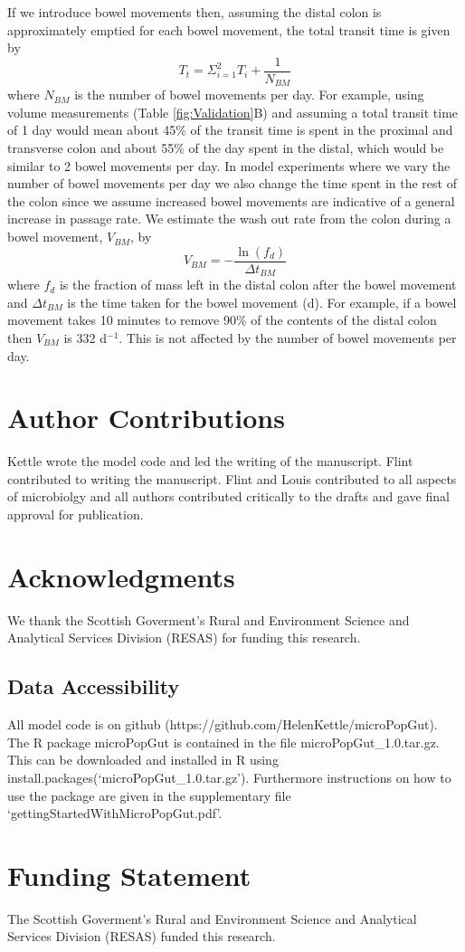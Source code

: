 \documentclass[a4paper]{article}
\begin{document}
If we introduce bowel movements then, assuming the distal colon is approximately emptied for each bowel movement, the total transit time is given by 
\begin{equation}
    T_t=\Sigma_{i=1}^2T_i + \frac{1}{N_{BM}}
\end{equation}
where $N_{BM}$ is the number of bowel movements per day.
For example, using volume measurements (Table \ref{fig:Validation}B) and assuming a total transit time of 1 day would mean about 45\% of the transit time is spent in the proximal and transverse colon and about 55\% of the day spent in the distal, which would be similar to 2 bowel movements per day. 
In model experiments where we vary the number of bowel movements per day we also change the time spent in the rest of the colon since we assume increased bowel movements are indicative of a general increase in passage rate.
We estimate the wash out rate from the colon during a bowel movement, $V_{BM}$, by
\begin{equation}
    V_{BM}=-\frac{\ln(f_d)}{\Delta t_{BM}}
\end{equation}
where $f_d$ is the fraction of mass left in the distal colon after the bowel movement and $\Delta t_{BM}$ is the time taken for the bowel movement (d). For example, if a bowel movement takes 10 minutes to remove 90\% of the contents of the distal colon then $V_{BM}$ is 332  d$^{-1}$. This is not affected by the number of bowel movements per day.

\section*{Author Contributions}
Kettle wrote the model code and led the writing of the manuscript. Flint contributed to writing the manuscript. Flint and Louis contributed to all aspects of microbiolgy and all authors contributed critically to the drafts and gave final approval for publication.

\section*{Acknowledgments}
We thank the Scottish Goverment's Rural and Environment Science and Analytical Services Division (RESAS) for funding this research. 

\subsection*{Data Accessibility}
All model code is on github (https://github.com/HelenKettle/microPopGut). The R package microPopGut is contained in the file microPopGut\_1.0.tar.gz. This can be downloaded and installed in R using install.packages(`microPopGut\_1.0.tar.gz'). Furthermore instructions on how to use the package are given in the supplementary file `gettingStartedWithMicroPopGut.pdf'.

\section*{Funding Statement}
The Scottish Goverment's Rural and Environment Science and Analytical Services Division (RESAS) funded this research.


\end{document}
